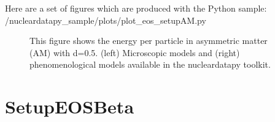 \documentclass[letterpaper,10pt,english]{sphinxmanual}
\begin{document}
\sphinxAtStartPar
Here are a set of figures which are produced with the Python sample: /nucleardatapy\_sample/plots/plot\_eos\_setupAM.py

\begin{figure}[htbp]
\centering
\capstart

\noindent{}
\caption{This figure shows the energy per particle in asymmetric matter (AM) with d=0.5. (left) Microscopic models and (right) phenomenological models available in the nucleardatapy toolkit.}\label{\detokenize{source/api/setup_eos_am:id1}}\end{figure}

\sphinxstepscope


\section{SetupEOSBeta}
\label{\detokenize{source/api/setup_eos_beta:setupeosbeta}}\label{\detokenize{source/api/setup_eos_beta::doc}}\label{\detokenize{source/api/setup_eos_beta:module-nucleardatapy.eos.setup_beta}}
\end{document}

